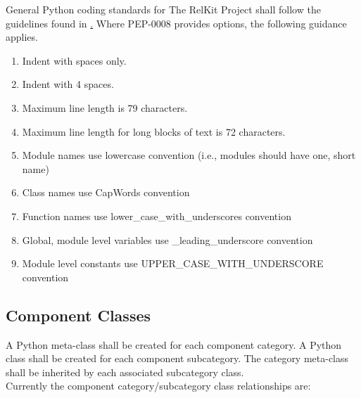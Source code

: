\documentclass[11pt, 12pt, twoside, onecolumn]{article}
\begin{document}
\noindent General Python coding standards for The RelKit Project shall follow the guidelines found in \href{http://www.python.org/dev/peps/pep-0008/ PEP-0008}.  Where PEP-0008 provides options, the following guidance applies.

\begin{enumerate}
	\item Indent with spaces only.
	\item Indent with 4 spaces.
	\item Maximum line length is 79 characters.
	\item Maximum line length for long blocks of text is 72 characters.
	\item Module names use lowercase convention (i.e., modules should have one, short name)
	\item Class names use CapWords convention
	\item Function names use lower\_case\_with\_underscores convention
	\item Global, module level variables use \_leading\_underscore convention
	\item Module level constants use UPPER\_CASE\_WITH\_UNDERSCORE convention
\end{enumerate}

\subsection{\bf \large Component Classes}

\noindent A Python meta-class shall be created for each component category.  A Python class shall be created for each component subcategory.  The category meta-class shall be inherited by each associated subcategory class. \\

\noindent Currently the component category/subcategory class relationships are: \\
\end{document}
